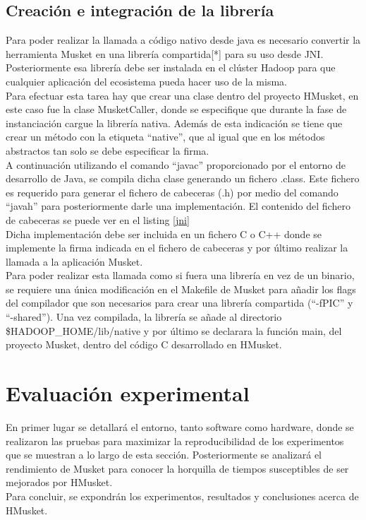 \documentclass[conference]{IEEEtran}
\begin{document}
\subsection{Creación e integración de la librería}
Para poder realizar la llamada a código nativo desde java es necesario convertir la herramienta Musket en una librería compartida[*] para su uso desde JNI. Posteriormente esa librería debe ser instalada en el clúster Hadoop para que cualquier aplicación del ecosistema pueda hacer uso de la misma.\\
Para efectuar esta tarea hay que crear una clase dentro del proyecto HMusket, en este caso fue la clase MusketCaller, donde se especifique que durante la fase de instanciación cargue la librería nativa. Además de esta indicación se tiene que crear un método con la etiqueta ``native'', que al igual que en los métodos abstractos tan solo se debe especificar la firma.\\
A continuación utilizando el comando ``javac'' proporcionado por el entorno de desarrollo de Java, se compila dicha clase generando un fichero .class. Este fichero es requerido para generar el fichero de cabeceras (.h) por medio del comando ``javah'' para posteriormente darle una implementación. El contenido del fichero de cabeceras se puede ver en el listing \ref{jni}\\
Dicha implementación debe ser incluida en un fichero C o C++ donde se implemente la firma indicada en el fichero de cabeceras y por último realizar la llamada a la aplicación Musket.\\
Para poder realizar esta llamada como si fuera una librería en vez de un binario, se requiere una única modificación en el Makefile de Musket para añadir los flags del compilador que son necesarios para crear una librería compartida (``-fPIC'' y ``-shared''). Una vez compilada, la librería se añade al directorio \$HADOOP\_HOME/lib/native y por último se declarara la función main, del proyecto Musket, dentro del código C desarrollado en HMusket.

\section{Evaluación experimental}
En primer lugar se detallará el entorno, tanto software como hardware, donde se realizaron las pruebas para maximizar la reproducibilidad de los experimentos que se muestran a lo largo de esta sección. Posteriormente se analizará el rendimiento de Musket para conocer la horquilla de tiempos susceptibles de ser mejorados por HMusket.\\
Para concluir, se expondrán los experimentos, resultados y conclusiones acerca de HMusket.
\end{document}
